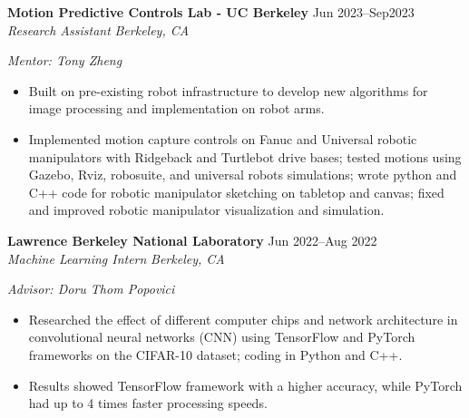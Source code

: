 \documentclass[11pt,a4paper]{article}
\newcommand{\resumeHeading}[4]{
  \vspace{0.15cm}
  \noindent\textbf{#1} \hfill #2 \\
  \noindent\textit{#3} \hfill \textit{#4} \par\vspace{0.1cm}
}
\begin{document}
\resumeHeading{Motion Predictive Controls Lab - UC Berkeley}{Jun 2023--Sep2023}{Research Assistant}{Berkeley, CA}
\textit{\small Mentor: Tony Zheng}
\begin{itemize}[leftmargin=0.2in, itemsep=2pt, parsep=0pt, topsep=2pt]
    \item Built on pre-existing robot infrastructure to develop new algorithms for image processing and implementation on robot arms. 
    \item Implemented motion capture controls on Fanuc and Universal robotic manipulators with Ridgeback and Turtlebot drive bases; tested motions using Gazebo, Rviz, robosuite, and universal robots simulations; wrote python and C++ code for robotic manipulator sketching on tabletop and canvas; fixed and improved robotic manipulator visualization and simulation.
\end{itemize}

\resumeHeading{Lawrence Berkeley National Laboratory}{Jun 2022--Aug 2022 }{Machine Learning Intern}{Berkeley, CA}
\textit{\small Advisor: Doru Thom Popovici}
\begin{itemize}[leftmargin=0.2in, itemsep=2pt, parsep=0pt, topsep=2pt]
    \item Researched the effect of different computer chips and network architecture in convolutional neural networks (CNN) using TensorFlow and PyTorch frameworks on the CIFAR-10 dataset; coding in Python and C++. 
    \item Results showed TensorFlow framework with a higher accuracy, while PyTorch had up to 4 times faster processing speeds.
\end{itemize}
\end{document}
